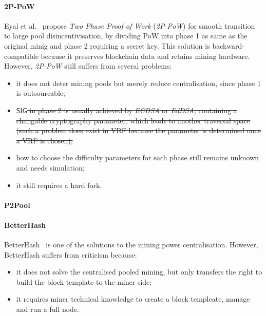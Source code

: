 \paragraph{\textbf{2P-PoW}}
Eyal et al.~\cite{2P-PoW} propose \textit{Two Phase Proof of Work} (\textit{2P-PoW}) for smooth transition to large pool disincentivisation, by dividing PoW into phase 1 as same as the original minig and phase 2 requiring a secret key.
This solution is backward-compatible because it preserves blockchain data and retains mining hardware. 
However, \textit{2P-PoW} still suffers from several problems:
\begin{itemize}
\renewcommand\labelitemi{$\bullet$}
    \item it does not deter mining pools but merely reduce centralisation, since phase 1 is outsourcable;
    \item \sout{$\mathsf{SIG}$ in phase 2 is usually achieved by \textit{ECDSA} or \textit{EdDSA}, containing a changable cryptography parameter, which leads to another traversal space (such a problem does exist in VRF because the parameter is determined once a VRF is chosen);} 
    \item how to choose the difficulty parameters for each phase still remains unknown and needs simulation;
    \item it still requires a hard fork.
\end{itemize}

\paragraph{\textbf{P2Pool}}



\paragraph{\textbf{BetterHash}}
BetterHash~\cite{draft-bip-BetterHash} is one of the solutions to the mining power centralisation.
However, BetterHash suffers from criticism because:
\begin{itemize}
\renewcommand\labelitemi{$\bullet$}
    \item it does not solve the centralised pooled mining, but only transfers the right to build the block template to the miner side;
    \item it requires miner technical knowledge to create a block templeate, manage and run a full node.
\end{itemize}
